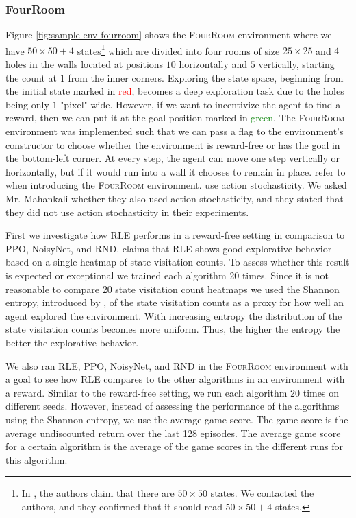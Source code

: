 \documentclass[10pt]{article} %
\begin{document}
\subsubsection{FourRoom}
\noindent Figure \ref{fig:sample-env-fourroom} shows the \textsc{FourRoom} environment where we have $50\times50 + 4$ states\footnote{In \cite{rle-paper}, the authors claim that there are $50\times 50$ states. We contacted the authors, and they confirmed that it should read $50\times 50 + 4$ states.} which are divided into four rooms of size $25\times25$ and $4$ holes in the walls located at positions $10$ horizontally and $5$ vertically, starting the count at $1$ from the inner corners. Exploring the state space, beginning from the initial state marked in \textcolor{red}{red}, becomes a deep exploration task due to the holes being only $1$ "pixel" wide. However, if we want to incentivize the agent to find a reward, then we can put it at the goal position marked in \textcolor{green}{green}. The \textsc{FourRoom} environment was implemented such that we can pass a flag to the environment's constructor to choose whether the environment is reward-free or has the goal in the bottom-left corner. At every step, the agent can move one step vertically or horizontally, but if it would run into a wall it chooses to remain in place. \cite{rle-paper} refer to \cite{grid-world-paper} when introducing the \textsc{FourRoom} environment. \cite{grid-world-paper} use action stochasticity. We asked Mr. Mahankali whether they also used action stochasticity, and they stated that they did not use action stochasticity in their experiments. 

First we investigate how RLE performs in a reward-free setting in comparison to PPO, NoisyNet, and RND. \cite{rle-paper} claims that RLE shows good explorative behavior based on a single heatmap of state visitation counts. To assess whether this result is expected or exceptional we trained each algorithm 20 times. Since it is not reasonable to compare 20 state visitation count heatmaps we used the Shannon entropy, introduced by \cite{shannon-entropy-paper}, of the state visitation counts as a proxy for how well an agent explored the environment. With increasing entropy the distribution of the state visitation counts becomes more uniform. Thus, the higher the entropy the better the explorative behavior. 

We also ran RLE, PPO, NoisyNet, and RND in the \textsc{FourRoom} environment with a goal to see how RLE compares to the other algorithms in an environment with a reward. Similar to the reward-free setting, we run each algorithm 20 times on different seeds. However, instead of assessing the performance of the algorithms using the Shannon entropy, we use the average game score. The game score is the average undiscounted return over the last 128 episodes. The average game score for a certain algorithm is the average of the game scores in the different runs for this algorithm.
\end{document}
